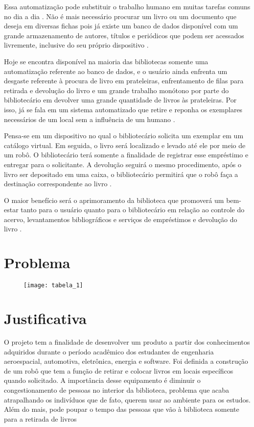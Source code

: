 Essa automatização pode substituir o trabalho humano em muitas tarefas comuns no dia a dia \cite{fraga2011}. Não é mais necessário procurar um livro ou um documento que deseja em diversas fichas pois já existe um banco de dados disponível com um grande armazenamento de autores, títulos e periódicos que podem ser acessados livremente, inclusive do seu próprio dispositivo \cite{santana2015}.

Hoje se encontra disponível na maioria das bibliotecas somente uma automatização referente ao banco de dados\cite{santana2015}, e o usuário ainda enfrenta um desgaste referente à procura de livro em prateleiras, enfrentamento de filas para retirada e devolução do livro e um grande trabalho monótono por parte do bibliotecário em devolver uma grande quantidade de livros às prateleiras. Por isso, já se fala em um sistema automatizado que retire e reponha os exemplares necessários de um local sem a influência de um humano \cite{fraga2011}. 

Pensa-se em um dispositivo no qual o bibliotecário solicita um exemplar em um catálogo virtual. Em seguida, o livro será localizado e levado até ele por meio de um robô. O bibliotecário terá somente a finalidade de registrar esse empréstimo e entregar para o solicitante.  A devolução seguirá o mesmo procedimento, após o livro ser depositado em uma caixa, o bibliotecário permitirá que o robô faça a destinação correspondente ao livro \cite{fraga2011}.

O maior benefício será o aprimoramento da biblioteca que promoverá um bem-estar tanto para o usuário quanto para o bibliotecário em relação ao controle do acervo, levantamentos bibliográficos e serviços de empréstimos e devolução do livro \cite{fraga2011}. 

\section{Problema}

\begin{figure}
\centering 
\texttt{[image: tabela\_1]}
\end{figure}

\section{Justificativa}
O projeto tem a finalidade de desenvolver um produto a partir dos conhecimentos adquiridos durante o período acadêmico dos estudantes de engenharia aeroespacial, automotiva, eletrônica, energia e software. Foi definida a construção de um robô que tem a função de retirar e colocar livros em locais específicos quando solicitado. A importância desse equipamento é diminuir o congestionamento de pessoas no interior da biblioteca, problema que acaba atrapalhando os indivíduos que de fato, querem usar ao ambiente para os estudos.  Além do mais, pode poupar o tempo das pessoas que vão à biblioteca somente para a retirada de livros

